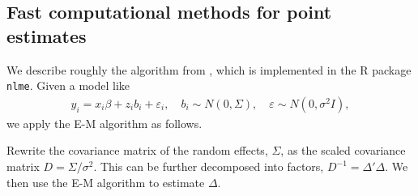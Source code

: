 \documentclass[12pt,twoside]{article}
\begin{document}
\begin{comment}
  How do we know that it finds the global likelihood? I guess if there is a global, you're guaranteed to find it?
\end{comment}
 
\subsection{Fast computational methods for point estimates}

We describe roughly the algorithm from \cite{Bates:aa}, which is implemented in the R package \texttt{nlme}. Given a model like \begin{align*}
  y_i = x_i\beta + z_ib_i + \varepsilon_i, \quad b_i \sim N(0, \Sigma), \quad \varepsilon \sim N(0, \sigma^2I),
\end{align*} we apply the E-M algorithm as follows.

Rewrite the covariance matrix of the random effects, \(\Sigma\), as the scaled covariance matrix \(D = \Sigma / \sigma^2\). This can be further decomposed into factors, \(D^{-1} = \Delta'\Delta\). We then use the E-M algorithm to estimate \(\Delta\).
\end{document}
